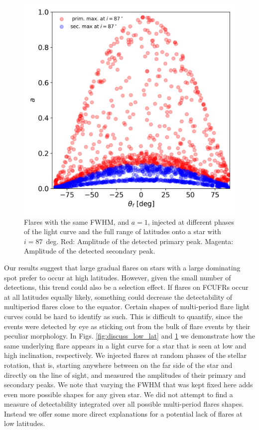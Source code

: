 \documentclass[fleqn,usenatbib,letters]{mnras}%
\begin{document}
\begin{figure}
	\includegraphics[width=\columnwidth]{figures/277539431_87_deg_latitude_flare_compilation_scatter_2.png}
    \caption{Flares with the same FWHM, and $a=1$, injected at different phases of the light curve and the full range of latitudes onto a star with $i=87$~deg. Red: Amplitude of the detected primary peak. Magenta: Amplitude of the detected secondary peak.}
    \label{fig:discuss_high_lat}
\end{figure}
Our results suggest that large gradual flares on stars with a large dominating spot prefer to occur at high latitudes. However, given the small number of detections, this trend could also be a selection effect. If flares on FCUFRs occur at all latitudes equally likely, something could decrease the detectability of multiperiod flares close to the equator. Certain shapes of multi-period flare light curves could be hard to identify as such. This is difficult to quantify, since the events were detected by eye as sticking out from the bulk of flare events by their peculiar morphology. In Figs. \ref{fig:discuss_low_lat} and \ref{fig:discuss_high_lat} we demonstrate how the same underlying flare appears in a light curve for a star that is seen at low and high inclination, respectively. We injected flares at random phases of the stellar rotation, that is, starting anywhere between on the far side of the star and directly on the line of sight, and measured the amplitudes of their primary and secondary peaks. We note that varying the FWHM that was kept fixed here adds even more possible shapes for any given star. We did not attempt to find a measure of detectability integrated over all possible multi-period flares shapes. Instead we offer some more direct explanations for a potential lack of flares at low latitudes.
\end{document}
